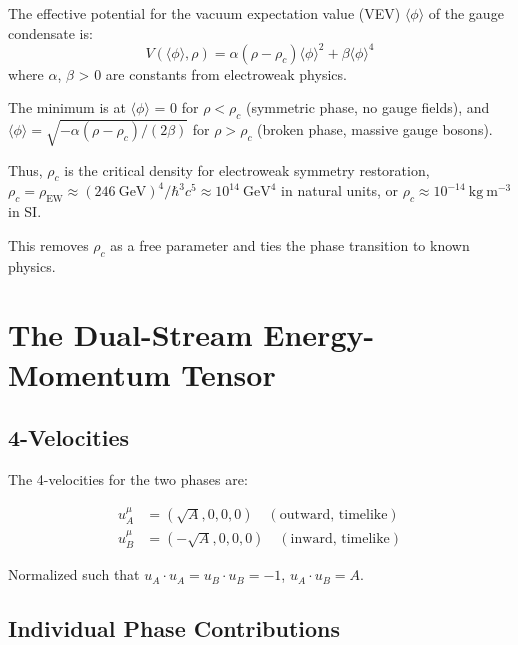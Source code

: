 \documentclass[10pt,twocolumn]{article}
\theoremstyle{definition}
\newcommand{\rhoc}{\rho_{c}}
\newcommand{\rhoEW}{\rho_{\mathrm{EW}}}
\begin{document}
The effective potential for the vacuum expectation value (VEV) $\langle\phi\rangle$ of the gauge condensate is:
\begin{equation}
   V( \langle \phi \rangle, \rho ) = \alpha (\rho - \rhoc) {\langle \phi \rangle}^{2} + \beta  {\langle \phi \rangle}^{4}
\end{equation}
where \( \alpha \), \( \beta \) > 0 are constants from electroweak physics.

The minimum is at \( \langle \phi \rangle \) = 0 for \( \rho < \rhoc \) (symmetric phase, no gauge fields), and \( \langle \phi \rangle = \sqrt{ -\alpha (\rho - \rhoc) / (2\beta) } \) for \( \rho > \rhoc \) (broken phase, massive gauge bosons).

Thus, \( \rhoc \) is the critical density for electroweak symmetry restoration, \( \rhoc = \rhoEW \approx (246 \ \mathrm{GeV})^4 / \hbar^3 c^5 \approx 10^{14} \ \mathrm{GeV}^4 \) in natural units, or \( \rhoc \approx 10^{-14} \ \mathrm{kg \ m^{-3}} \) in SI.

This removes \( \rhoc \) as a free parameter and ties the phase transition to known physics.

\section{The Dual-Stream Energy-Momentum Tensor}
\label{sec:emt}

\subsection{4-Velocities}

The 4-velocities for the two phases are:

\begin{align}
  u_{A}^{\mu} &= (\sqrt{A}, 0, 0, 0) \quad (\text{outward, timelike}) \\
  u_{B}^{\mu} &= (-\sqrt{A}, 0, 0, 0) \quad (\text{inward, timelike})
\end{align}

Normalized such that \( u_{A} \cdot u_{A} = u_{B} \cdot u_{B} = -1 \), \( u_{A} \cdot u_{B} = A \).

\subsection{Individual Phase Contributions}
\end{document}
